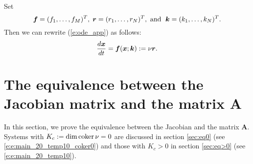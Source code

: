 \documentclass[ amsmath,amssymb,nofootinbib
]{revtex4-1}
\def\mbf#1{\mbox{\boldmath $#1$}}
\newcommand{\be}{\begin{equation}}
\newcommand{\ee}{\end{equation}}
\newcommand{\bx}{{\mbf x}}
\newcommand{\bfe}{{\mbf f}}
\newcommand{\br}{{\mbf r}}
\begin{document}
Set
$$
    \bfe=(f_1,\ldots,f_M)^T,  \;  \br = (r_1,\ldots,r_N)^T,    \mbox{ and } \;
       {\mbf k} = (k_1,\ldots,k_N)^T.
$$
Then we can rewrite (\ref{e:ode_app}) as follows:
\be  \label{e:ode_short}
         \frac{d \bx}{dt} = \bfe(\bx;\mbf k) := \nu \br.
\ee



%

\section{The equivalence between the Jacobian matrix and the matrix {\bf A }}
In this section, we prove the equivalence between the Jacobian and the matrix {\bf A}. Systems with $K_c:= {\rm dim \, coker}\, \nu=0$ are discussed in section \ref{sec:eq0} (see \eqref{e:e:main_20_temp10_coker0}) and those with $K_c >0$ in section \ref{sec:eq>0} (see \eqref{e:e:main_20_temp10}).
\end{document}
